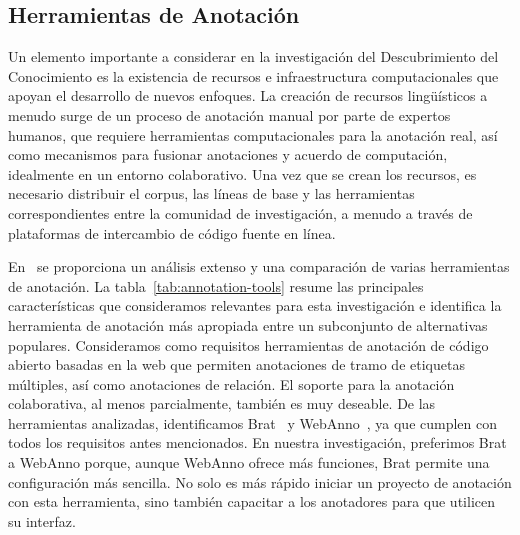 \subsection{Herramientas de Anotación}

Un elemento importante a considerar en la investigación del Descubrimiento del Conocimiento es la existencia de recursos e infraestructura computacionales que apoyan el desarrollo de nuevos enfoques.
La creación de recursos lingüísticos a menudo surge de un proceso de anotación manual por parte de expertos humanos, que requiere herramientas computacionales para la anotación real, así como mecanismos para fusionar anotaciones y acuerdo de computación, idealmente en un entorno colaborativo.
Una vez que se crean los recursos, es necesario distribuir el corpus, las líneas de base y las herramientas correspondientes entre la comunidad de investigación, a menudo a través de plataformas de intercambio de código fuente en línea.

En~\citet{annotation-tools} se proporciona un análisis extenso y una comparación de varias herramientas de anotación.
La tabla~\ref{tab:annotation-tools} resume las principales características que consideramos relevantes para esta investigación e identifica la herramienta de anotación más apropiada entre un subconjunto de alternativas populares.
Consideramos como requisitos herramientas de anotación de código abierto basadas en la web que permiten anotaciones de tramo de etiquetas múltiples, así como anotaciones de relación. El soporte para la anotación colaborativa, al menos parcialmente, también es muy deseable.
De las herramientas analizadas, identificamos Brat~\cite{brat} y WebAnno~\cite{webanno}, ya que cumplen con todos los requisitos antes mencionados. En nuestra investigación, preferimos Brat a WebAnno porque, aunque WebAnno ofrece más funciones, Brat permite una configuración más sencilla. No solo es más rápido iniciar un proyecto de anotación con esta herramienta, sino también capacitar a los anotadores para que utilicen su interfaz.

